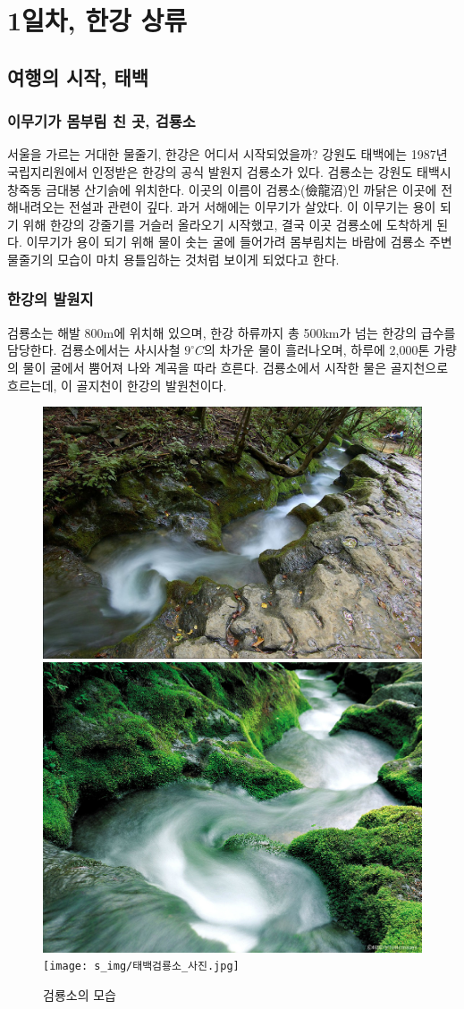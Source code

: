 
\chapter{1일차, 한강 상류}
\section{여행의 시작, 태백}
\subsection{이무기가 몸부림 친 곳, 검룡소}
서울을 가르는 거대한 물줄기, 한강은 어디서 시작되었을까? 
강원도 태백에는 1987년 국립지리원에서 인정받은 한강의 공식 발원지 검룡소가 있다. 
검룡소는 강원도 태백시 창죽동 금대봉 산기슭에 위치한다. 
이곳의 이름이 검룡소(儉龍沼)인 까닭은 이곳에 전해내려오는 전설과 관련이 깊다. 과거 서해에는 이무기가 살았다. 
이 이무기는 용이 되기 위해 한강의 강줄기를 거슬러 올라오기 시작했고, 결국 이곳 검룡소에 도착하게 된다. 
이무기가 용이 되기 위해 물이 솟는 굴에 들어가려 몸부림치는 바람에 검룡소 주변 물줄기의 모습이 마치 용틀임하는 것처럼 보이게 되었다고 한다. 

\subsection{한강의 발원지}
검룡소는 해발 800m에 위치해 있으며, 한강 하류까지 총 500km가 넘는 한강의 급수를 담당한다. 
검룡소에서는 사시사철 $9^\circ C$의 차가운 물이 흘러나오며, 
하루에 2,000톤 가량의 물이 굴에서 뿜어져 나와 계곡을 따라 흐른다. 
검룡소에서 시작한 물은 골지천으로 흐르는데, 이 골지천이 한강의 발원천이다. 

\begin{figure}
    \centering
    \includegraphics[width=.32\textwidth]{s_img/검룡소_사진.jpg}
    \includegraphics[width=.32\textwidth]{s_img/검룡소_사진2.jpeg}
    \texttt{[image: s\_img/태백검룡소\_사진.jpg]}
    \caption{검룡소의 모습}
    \label{fig:my_label_s1}
 \end{figure}

